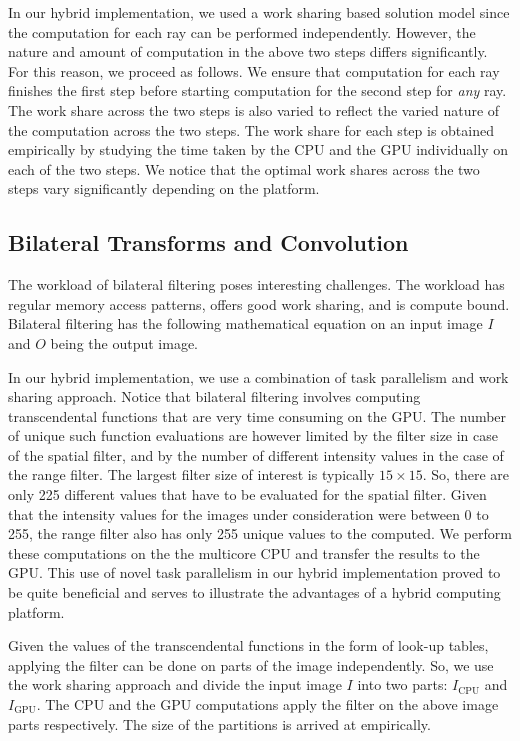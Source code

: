 \documentclass[11pt]{article}
\begin{document}
In our hybrid implementation, we used a work sharing based solution model
since the computation for each ray can be performed independently. However,
the nature and amount of computation in the above two steps differs
significantly. For this reason, we proceed as follows. We ensure that
computation for each ray finishes the first step before starting computation
for  the  second step for {\em any} ray. The work share across the two steps 
is also varied to reflect the varied nature of the computation across the two
steps. The work share for each step is obtained empirically by studying the
time taken by the CPU and the GPU individually on each of the two steps. We
notice that the optimal work shares across the two steps vary significantly 
depending on the platform.



\subsection{Bilateral Transforms and Convolution}
The workload of bilateral filtering poses interesting challenges.  The
workload has regular memory access patterns, offers good work sharing, 
and is compute bound. Bilateral filtering has the following mathematical
equation on an input image $I$ and $O$ being the output image. 

In our hybrid implementation, we use a combination of task parallelism and
work sharing approach. Notice that bilateral filtering involves computing transcendental 
functions that are very time consuming on the GPU. The number of unique such
function evaluations are however limited by the filter size in case of the
spatial filter, and by the number of different intensity values in the case of
the range filter. The largest filter size of interest is typically $15\times
15$. So, there are only 225 different values that have to be evaluated for the
spatial filter. Given that the intensity values for the images under
consideration were between 0 to 255, the range filter also has only 255 unique
values to the computed.  We perform these computations on the 
the multicore CPU and transfer the results to the GPU. This use of novel task
parallelism in our hybrid implementation proved to be quite beneficial and
serves to illustrate the advantages of a hybrid computing platform. 

Given the values of the transcendental functions in the form of  look-up
tables, applying the filter can be done on parts of the image independently.
So, we use the work sharing approach and divide the input image $I$ into two
parts: $I_{\textrm{CPU}}$ and $I_{\textrm{GPU}}$. The CPU and the GPU
computations apply the filter on the above image parts respectively. The size
of the partitions is arrived at empirically. 
\end{document}
